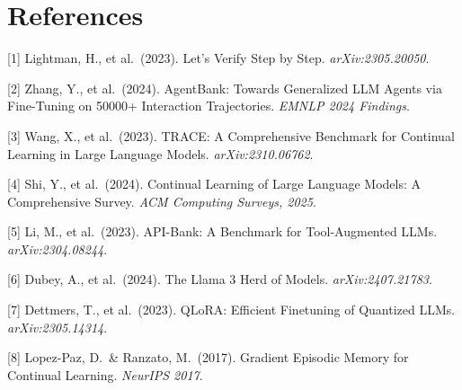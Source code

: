 \documentclass{article}
\begin{document}
\section*{References}
\small

[1] Lightman, H., et al.\ (2023). Let's Verify Step by Step. \textit{arXiv:2305.20050}.

[2] Zhang, Y., et al.\ (2024). AgentBank: Towards Generalized LLM Agents via Fine-Tuning on 50000+ Interaction Trajectories. \textit{EMNLP 2024 Findings}.

[3] Wang, X., et al.\ (2023). TRACE: A Comprehensive Benchmark for Continual Learning in Large Language Models. \textit{arXiv:2310.06762}.

[4] Shi, Y., et al.\ (2024). Continual Learning of Large Language Models: A Comprehensive Survey. \textit{ACM Computing Surveys, 2025}.

[5] Li, M., et al.\ (2023). API-Bank: A Benchmark for Tool-Augmented LLMs. \textit{arXiv:2304.08244}.

[6] Dubey, A., et al.\ (2024). The Llama 3 Herd of Models. \textit{arXiv:2407.21783}.

[7] Dettmers, T., et al.\ (2023). QLoRA: Efficient Finetuning of Quantized LLMs. \textit{arXiv:2305.14314}.

[8] Lopez-Paz, D.\ \& Ranzato, M.\ (2017). Gradient Episodic Memory for Continual Learning. \textit{NeurIPS 2017}.
\end{document}
